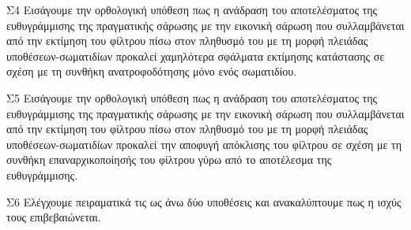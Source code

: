 \begin{bw_box}
\begin{customcontribution}{Σ4}
  \label{contribution:04}
  Εισάγουμε την ορθολογική υπόθεση πως η ανάδραση του αποτελέσματος της
  ευθυγράμμισης της πραγματικής σάρωσης με την εικονική σάρωση που συλλαμβάνεται
  από την εκτίμηση του φίλτρου πίσω στον πληθυσμό του με τη μορφή πλειάδας
  υποθέσεων-σωματιδίων προκαλεί χαμηλότερα σφάλματα εκτίμησης κατάστασης σε
  σχέση με τη συνθήκη ανατροφοδότησης μόνο ενός σωματιδίου.
\end{customcontribution}
\end{bw_box}

\begin{bw_box}
\begin{customcontribution}{Σ5}
  \label{contribution:05}
  Εισάγουμε την ορθολογική υπόθεση πως η ανάδραση του αποτελέσματος της
  ευθυγράμμισης της πραγματικής σάρωσης με την εικονική σάρωση που συλλαμβάνεται
  από την εκτίμηση του φίλτρου πίσω στον πληθυσμό του με τη μορφή πλειάδας
  υποθέσεων-σωματιδίων προκαλεί την αποφυγή απόκλισης του φίλτρου σε σχέση
  με τη συνθήκη επαναρχικοποίησής του φίλτρου γύρω από το αποτέλεσμα της
  ευθυγράμμισης.
\end{customcontribution}
\end{bw_box}

\begin{bw_box}
\begin{customcontribution}{Σ6}
  \label{contribution:06}
  Ελέγχουμε πειραματικά τις ως άνω δύο υποθέσεις και ανακαλύπτουμε πως η ισχύς
  τους επιβεβαιώνεται.
\end{customcontribution}
\end{bw_box}


